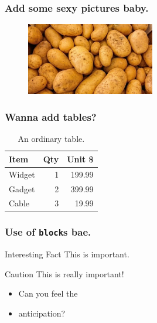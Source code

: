 \documentclass{beamer}
\begin{document}
\begin{frame}
    \frametitle{Add some sexy pictures baby.}
    \begin{figure}
        \includegraphics[width=0.5\textwidth]{potato}
    \end{figure}
\end{frame}

\begin{frame}
    \frametitle{Wanna add tables?}
    \begin{table}
        \begin{tabular}{ |l|r|r| }
            \hline
            Item & Qty & Unit \$ \\
            \hline
            Widget & 1 & 199.99 \\
            Gadget & 2 & 399.99 \\
            Cable & 3 & 19.99 \\
            \hline
        \end{tabular}
        \caption{An ordinary table.}
    \end{table}
\end{frame}

\begin{frame}
    \frametitle{Use of \texttt{block}s bae.}
    \begin{block}{Interesting Fact}
    This is important.
    \end{block}
    \begin{alertblock}{Caution}
    This is really important!
    \end{alertblock}
\end{frame}

\begin{frame}
    \begin{itemize}
        \item Can you feel the
        \pause \item anticipation?
    \end{itemize}
\end{frame}
\end{document}
